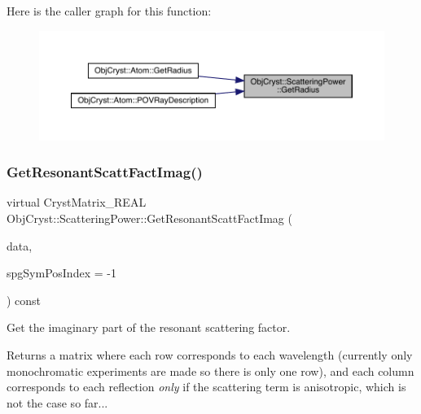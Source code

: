 Here is the caller graph for this function\+:
\nopagebreak
\begin{figure}[H]
\begin{center}
\leavevmode
\includegraphics[width=350pt]{class_obj_cryst_1_1_scattering_power_ac44860aca21734844379ddec87622f7b_icgraph}
\end{center}
\end{figure}
\mbox{\label{class_obj_cryst_1_1_scattering_power_a9bc5d86bf76116f645b43d46f2a9771c}} 
\subsubsection{\texorpdfstring{GetResonantScattFactImag()}{GetResonantScattFactImag()}}
{\footnotesize\ttfamily virtual Cryst\+Matrix\+\_\+\+R\+E\+AL Obj\+Cryst\+::\+Scattering\+Power\+::\+Get\+Resonant\+Scatt\+Fact\+Imag (\begin{DoxyParamCaption}\item[{const \mbox{\hyperlink{class_obj_cryst_1_1_scattering_data}{Scattering\+Data}} \&}]{data,  }\item[{const int}]{spg\+Sym\+Pos\+Index = {\ttfamily -\/1} }\end{DoxyParamCaption}) const\hspace{0.3cm}{\ttfamily [pure virtual]}}



Get the imaginary part of the resonant scattering factor. 

\begin{DoxyReturn}{Returns}
a matrix where each row corresponds to each wavelength (currently only monochromatic experiments are made so there is only one row), and each column corresponds to each reflection {\itshape only} if the scattering term is anisotropic, which is not the case so far... 
\end{DoxyReturn}

